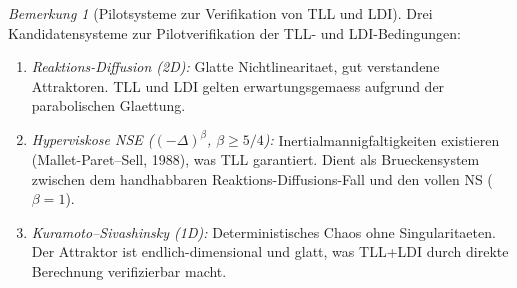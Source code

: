 \documentclass[12pt,a4paper]{article}
\theoremstyle{definition}
\theoremstyle{plain}
\theoremstyle{remark}
\newtheorem{remark}[definition]{Bemerkung}
\begin{document}
\begin{remark}[Pilotsysteme zur Verifikation von TLL und LDI]
\label{rem:pilot-verification}
Drei Kandidatensysteme zur Pilotverifikation der TLL- und LDI-Bedingungen:
\begin{enumerate}
\item \emph{Reaktions-Diffusion (2D):} Glatte Nichtlinearitaet, gut verstandene Attraktoren. TLL und LDI gelten erwartungsgemaess aufgrund der parabolischen Glaettung.
\item \emph{Hyperviskose NSE ($(-\Delta)^\beta$, $\beta \geq 5/4$):} Inertialmannigfaltigkeiten existieren (Mallet-Paret--Sell, 1988), was TLL garantiert. Dient als Brueckensystem zwischen dem handhabbaren Reaktions-Diffusions-Fall und den vollen NS ($\beta = 1$).
\item \emph{Kuramoto--Sivashinsky (1D):} Deterministisches Chaos ohne Singularitaeten. Der Attraktor ist endlich-dimensional und glatt, was TLL+LDI durch direkte Berechnung verifizierbar macht.
\end{enumerate}
\end{remark}
\end{document}
